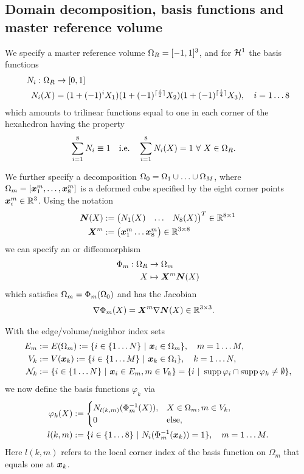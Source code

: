 \subsection{Domain decomposition, basis functions and master reference volume}
We specify a master reference volume $\Omega_R = [-1,1]^3$, and for $\mathcal{H}^1$ the basis functions
\begin{align*}
	N_i:\Omega_R &\to [0,1]\\
	N_i(X)  &= (1+(-1)^{i}X_1)(1+(-1)^{\lceil\frac{i}{2}\rceil}X_2)(1+(-1)^{\lceil\frac{i}{4}\rceil}X_3),\quad i=1\ldots 8
\end{align*}
which amounts to trilinear functions equal to one in each corner of the hexahedron having the property
\begin{align}
	\sum\limits_{i=1}^{8}N_i &\equiv 1 & \text{i.e.}\quad \sum\limits_{i=1}^{8}N_i(X) &= 1 ~\forall~ X\in\Omega_R.
\end{align}

We further specify a decomposition $\Omega_0 = \Omega_1\cup \ldots \cup \Omega_M$, where
$\Omega_m = [\boldsymbol{x}^m_1,\ldots,\boldsymbol{x}^m_8]$ is a deformed cube specified by the eight corner points $\boldsymbol{x}_i^m\in\mathbb{R}^3$.
Using the notation
\begin{align}
	\boldsymbol{N}(X) &:= \left(\begin{matrix}N_1(X) & \ldots & N_8(X)\end{matrix}\right)^T\in\mathbb{R}^{8\times 1}\\
	\boldsymbol{X}^m &:= \left(\begin{matrix}\boldsymbol{x}^m_1 \ldots \boldsymbol{x}^m_8\end{matrix}\right) \in\mathbb{R}^{3\times 8}
\end{align}
 we can specify an  or diffeomorphism
\begin{align}
	\Phi_m : \Omega_R &\to \Omega_m\\
	X &\mapsto \boldsymbol{X}^m\boldsymbol{N}(X)
\end{align}
which satisfies $\Omega_m = \Phi_m(\Omega_0)$ and has the Jacobian
\begin{align}
	\nabla\Phi_m(X) &= \boldsymbol{X}^m\nabla\boldsymbol{N}(X) \in \mathbb{R}^{3\times 3}.\label{def:refbasis_jacobian}
\end{align}
 
With the edge/volume/neighbor index sets
\begin{align}
	E_m &:= E(\Omega_m) := \{i\in\{1\ldots N\}~|~ \boldsymbol{x}_i\in\Omega_m\}, \quad m=1\ldots M,\\
	V_k &:= V(\boldsymbol{x}_k) := \{i\in\{1\ldots M\}~|~ \boldsymbol{x}_k\in\Omega_i\}, \quad k=1\ldots N,\\
	\mathcal{N}_k &:= \{i\in\{1\ldots N\}~|~ \boldsymbol{x}_i\in E_m, m\in V_k\} = \{i ~|~ \operatorname{supp}\varphi_i \cap \operatorname{supp}\varphi_k \neq\emptyset\},
\end{align}
we now define the basis functions $\varphi_k$ via
\begin{align}
	\varphi_k(X) &:= \begin{cases}
		N_{l(k,m)}(\Phi^{-1}_m(X)), & X\in\Omega_m, m\in V_k,\\
		0 & \text{else},	
	\end{cases}\label{def:referencebasisfun}\\
	l(k,m) &:= \{i\in\{1\ldots 8\}~|~ N_i(\Phi_m^{-1}(\boldsymbol{x}_k))=1\},\quad m=1\ldots M.
\end{align}
Here $l(k,m)$ refers to the local corner index of the basis function on $\Omega_m$ that equals one at $\boldsymbol{x}_k$.

